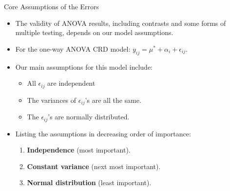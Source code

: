 \begin{frame}{Core Assumptions of the Errors}
  \begin{itemize}
    \item The validity of ANOVA results, including contrasts and some forms of multiple testing, depends on our model assumptions.
    \item For the one-way ANOVA CRD model: $y_{ij} = \mu^* + \alpha_i + \epsilon_{ij}$.
    \item Our main assumptions for this model include:
    \begin{itemize}
      \item All $\epsilon_{ij}$ are independent 
      \item The variances of $\epsilon_{ij}$'s are all the same.
      \item The $\epsilon_{ij}$'s are normally distributed.
    \end{itemize}
    
    
    \framebreak
    
    \item Listing the assumptions in decreasing order of importance:
    \begin{enumerate}
      \item \textbf{Independence} (most important). 
      \item \textbf{Constant variance} (next most important). 
      \item \textbf{Normal distribution} (least important). 
    \end{enumerate}
    
  \end{itemize}
  

\end{frame}

